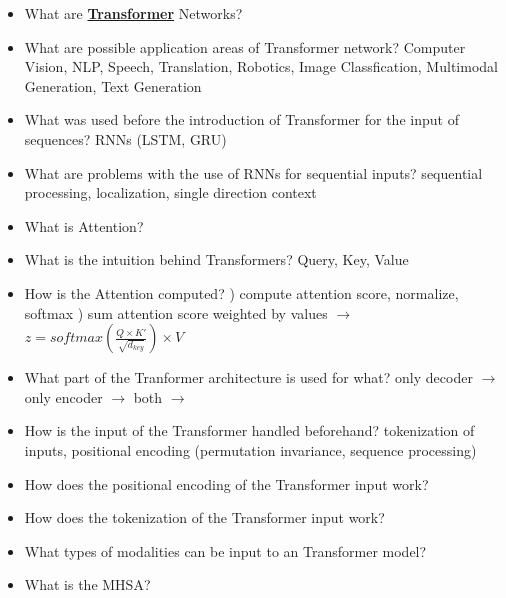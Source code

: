 \documentclass{report}
\begin{document}
\begin{itemize}
		\item What are \textbf{\underline{Transformer}} Networks?
		\newline 
		\item What are possible application areas of Transformer network?
		\newline Computer Vision, NLP, Speech, Translation, Robotics, Image Classfication, Multimodal Generation, Text Generation
		\item What was used before the introduction of Transformer for the input of sequences?
		\newline RNNs (LSTM, GRU)
		\item What are problems with the use of RNNs for sequential inputs?
		\newline sequential processing, localization, single direction context
		\item What is Attention?
		\newline 
		\item What is the intuition behind Transformers?
		\newline Query, Key, Value
		\item How is the Attention computed?
		) compute attention score, normalize, softmax
		) sum attention score weighted by values
		\newline $\rightarrow$ $z = softmax(\frac{Q \times K'}{\sqrt{d_{key}}}) \times V$
		\item What part of the Tranformer architecture is used for what?
		\newline only decoder $\rightarrow$
		\newline only encoder $\rightarrow$
		\newline both $\rightarrow$
		\item How is the input of the Transformer handled beforehand?
		\newline tokenization of inputs, positional encoding (permutation invariance, sequence processing)
		\item How does the positional encoding of the Transformer input work?
		\newline 
		\item How does the tokenization of the Transformer input work?
		\newline 
		\item What types of modalities can be input to an Transformer model?
		\newline 
		\item What is the MHSA?

\end{itemize}
\end{document}
